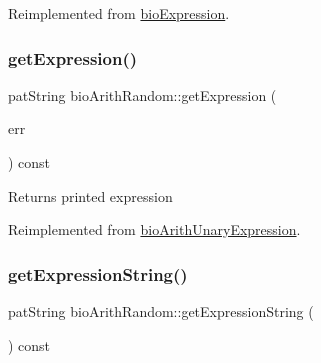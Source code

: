 Reimplemented from \hyperlink{classbio_expression_a5915579d1193f25f216c1e273c97f2ce}{bio\+Expression}.

\mbox{\label{classbio_arith_random_a54b48a4876469d44f324f73758ea1b6c}} 
\subsubsection{\texorpdfstring{get\+Expression()}{getExpression()}}
{\footnotesize\ttfamily pat\+String bio\+Arith\+Random\+::get\+Expression (\begin{DoxyParamCaption}\item[{pat\+Error $\ast$\&}]{err }\end{DoxyParamCaption}) const\hspace{0.3cm}{\ttfamily [virtual]}}

\begin{DoxyReturn}{Returns}
printed expression 
\end{DoxyReturn}


Reimplemented from \hyperlink{classbio_arith_unary_expression_a974b7779804861f331a75e08db377926}{bio\+Arith\+Unary\+Expression}.

\mbox{\label{classbio_arith_random_a9ba191f0138f188b1c70f568c5873434}} 
\subsubsection{\texorpdfstring{get\+Expression\+String()}{getExpressionString()}}
{\footnotesize\ttfamily pat\+String bio\+Arith\+Random\+::get\+Expression\+String (\begin{DoxyParamCaption}{ }\end{DoxyParamCaption}) const\hspace{0.3cm}{\ttfamily [virtual]}}

